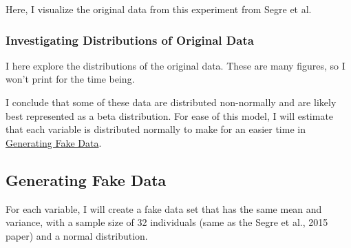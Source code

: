 \documentclass[
  letterpaper,
  DIV=11,
  numbers=noendperiod]{scrartcl}
\newenvironment{Shaded}{\begin{snugshade}}{\end{snugshade}}
\newcommand{\CommentTok}[1]{\textcolor[rgb]{0.37,0.37,0.37}{#1}}
\begin{document}
Here, I visualize the original data from this experiment from Segre et
al.

\begin{Shaded}
\end{Shaded}

\begin{figure}

\end{figure}

\hypertarget{investigating-distributions-of-original-data}{%
\subsubsection{Investigating Distributions of Original
Data}\label{investigating-distributions-of-original-data}}

I here explore the distributions of the original data. These are many
figures, so I won't print for the time being.

I conclude that some of these data are distributed non-normally and are
likely best represented as a beta distribution. For ease of this model,
I will estimate that each variable is distributed normally to make for
an easier time in \protect\hyperlink{generating-fake-data}{Generating
Fake Data}.

\hypertarget{generating-fake-data}{%
\subsection{Generating Fake Data}\label{generating-fake-data}}

For each variable, I will create a fake data set that has the same mean
and variance, with a sample size of 32 individuals (same as the Segre et
al., 2015 paper) and a normal distribution.
\end{document}
